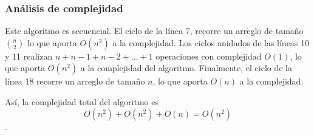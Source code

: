   \subsubsection{Análisis de complejidad}

  Este algoritmo es secuencial. El ciclo de la línea 7, recorre un arreglo de tamaño
  $\binom{n}{2}$ lo que aporta $O(n^2)$ a la complejidad. Los ciclos anidados de las
  líneas 10 y 11 realizan $n + n-1 + n-2 + \dots + 1$ operaciones con complejidad $O(1)$,
  lo que aporta $O(n^2)$  a la complejidad del algoritmo. Finalmente, el ciclo de la
  línea 18 recorre un arreglo de tamaño $n$, lo que aporta $O(n)$ a la complejidad.

  Así, la complejidad total del algoritmo es \[ O(n^2) + O(n^2) + O(n) = O(n^2)\].
